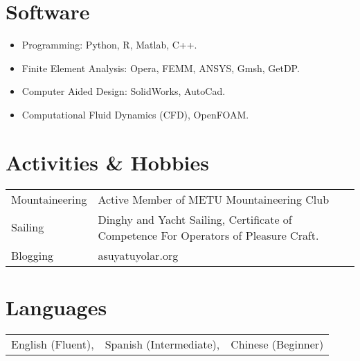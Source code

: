 \documentclass[a4paper,12pt]{article}
\begin{document}
\section{Software}
\begin{itemize}
\item Programming: Python, R, Matlab, C++.
\item Finite Element Analysis: Opera, FEMM, ANSYS, Gmsh, GetDP.
\item Computer Aided Design: SolidWorks, AutoCad.
\item Computational Fluid Dynamics (CFD), OpenFOAM.
\end{itemize}

\section{Activities \& Hobbies}
\begin{tabular}{ll}
Mountaineering & Active Member of METU Mountaineering Club\\
Sailing & Dinghy and Yacht Sailing, Certificate of Competence For Operators of Pleasure Craft. \\
Blogging & asuyatuyolar.org\\
\end{tabular}

\section{Languages}
\begin{tabular}{lll} 
English (Fluent), & Spanish (Intermediate), & Chinese (Beginner)
\end{tabular}


\begin{publications}
\end{publications}


\end{document}
